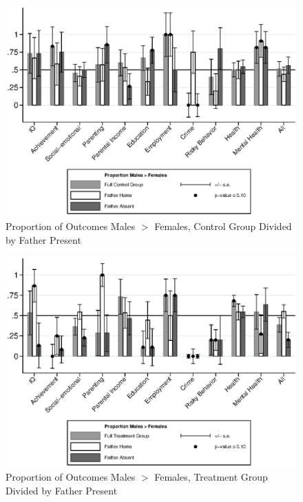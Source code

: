 \begin{figure}
\centering
\caption{Proportion of Outcomes Males $>$ Females, Control Group Divided by Father Present}
\includegraphics[width=\textwidth]{output/gendergaps-control-moderated-fhome}
\end{figure}

\begin{figure}
\centering
\caption{Proportion of Outcomes Males $>$ Females, Treatment Group Divided by Father Present}
\includegraphics[width=\textwidth]{output/gendergaps-treatment-moderated-fhome}
\end{figure}

